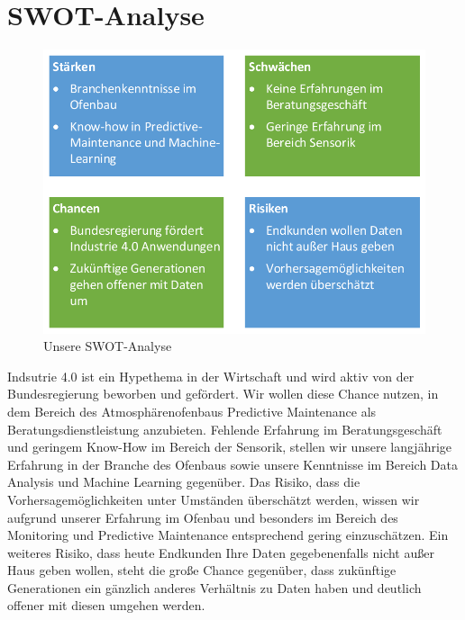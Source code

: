 \section{SWOT-Analyse}

\begin{figure}[H]
\centering
\includegraphics[width=0.7\linewidth]{Bilder/SWOT}
\caption{Unsere SWOT-Analyse}
\label{fig:SWOT}
\end{figure}


Indsutrie 4.0 ist ein Hypethema in der Wirtschaft und wird aktiv von der Bundesregierung beworben und gefördert. Wir wollen diese Chance nutzen, in dem Bereich des Atmosphärenofenbaus Predictive Maintenance als Beratungsdienstleistung anzubieten. Fehlende Erfahrung im Beratungsgeschäft und geringem Know-How im Bereich der Sensorik, stellen wir unsere langjährige Erfahrung in der Branche des Ofenbaus sowie unsere Kenntnisse im Bereich Data Analysis und Machine Learning gegenüber. Das Risiko, dass die Vorhersagemöglichkeiten unter Umständen überschätzt werden, wissen wir aufgrund unserer Erfahrung im Ofenbau und besonders im Bereich des Monitoring und Predictive Maintenance entsprechend gering einzuschätzen. Ein weiteres Risiko, dass heute Endkunden Ihre Daten gegebenenfalls nicht außer Haus geben wollen, steht die große Chance gegenüber, dass zukünftige Generationen ein gänzlich anderes Verhältnis zu Daten haben und deutlich offener mit diesen umgehen werden.
